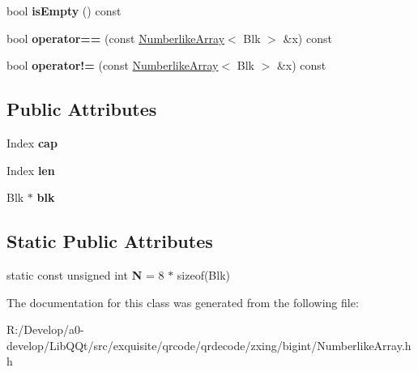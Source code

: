 \begin{DoxyCompactItemize}
bool {\bfseries is\+Empty} () const
\item 
\mbox{\label{class_numberlike_array_ab8abf1847351e6b1aa5f18bc47bd3bd6}} 
bool {\bfseries operator==} (const \mbox{\hyperlink{class_numberlike_array}{Numberlike\+Array}}$<$ Blk $>$ \&x) const
\item 
\mbox{\label{class_numberlike_array_a015fd3cc55a9c0f37ec43cfd0348b3f2}} 
bool {\bfseries operator!=} (const \mbox{\hyperlink{class_numberlike_array}{Numberlike\+Array}}$<$ Blk $>$ \&x) const
\end{DoxyCompactItemize}
\subsection*{Public Attributes}
\begin{DoxyCompactItemize}
\item 
\mbox{\label{class_numberlike_array_ab1a4e9d5eda64625ab32054645e82489}} 
Index {\bfseries cap}
\item 
\mbox{\label{class_numberlike_array_aa016f396175bd4084f40204a4d748eb9}} 
Index {\bfseries len}
\item 
\mbox{\label{class_numberlike_array_a378baefd25f016ba27ade9cc5dbb09b2}} 
Blk $\ast$ {\bfseries blk}
\end{DoxyCompactItemize}
\subsection*{Static Public Attributes}
\begin{DoxyCompactItemize}
\item 
\mbox{\label{class_numberlike_array_a25b7418a31008a14a5efd6610b0fa258}} 
static const unsigned int {\bfseries N} = 8 $\ast$ sizeof(Blk)
\end{DoxyCompactItemize}


The documentation for this class was generated from the following file\+:\begin{DoxyCompactItemize}
\item 
R\+:/\+Develop/a0-\/develop/\+Lib\+Q\+Qt/src/exquisite/qrcode/qrdecode/zxing/bigint/Numberlike\+Array.\+hh\end{DoxyCompactItemize}
